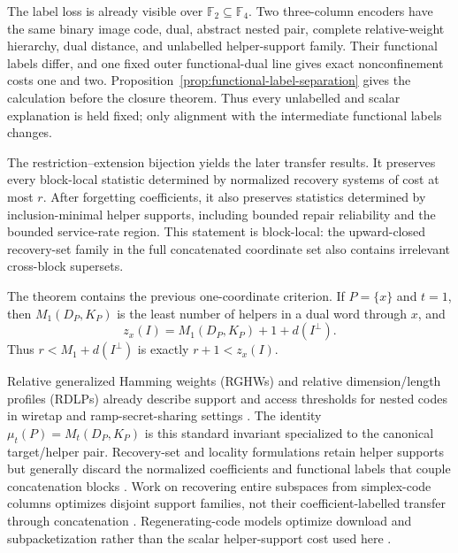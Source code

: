 \documentclass[11pt]{article}
\theoremstyle{definition}
\newcommand{\F}{\mathbb F}
\begin{document}
The label loss is already visible over $\F_2\subseteq\F_4$.  Two
three-column encoders have the same binary image code, dual, abstract nested
pair, complete relative-weight hierarchy, dual distance, and unlabelled
helper-support family.  Their functional labels differ, and one fixed outer
functional-dual line gives exact nonconfinement costs one and two.
Proposition~\ref{prop:functional-label-separation} gives the calculation before
the closure theorem.  Thus every unlabelled and scalar explanation is held
fixed; only alignment with the intermediate functional labels changes.

The restriction--extension bijection yields the later transfer results.  It preserves every
block-local statistic determined by normalized recovery systems of cost at
most $r$.  After forgetting coefficients, it also preserves statistics
determined by inclusion-minimal helper supports, including bounded repair
reliability and the bounded service-rate region.  This statement is
block-local: the upward-closed recovery-set family in the full concatenated
coordinate set also contains irrelevant cross-block supersets.

The theorem contains the previous one-coordinate criterion.  If $P=\{x\}$
and $t=1$, then $M_1(D_P,K_P)$ is the least number of helpers in a dual word
through $x$, and
\[
 z_x(I)=M_1(D_P,K_P)+1+d(I^\perp).
\]
Thus $r<M_1+d(I^\perp)$ is exactly $r+1<z_x(I)$.

Relative generalized Hamming weights (RGHWs) and relative dimension/length
profiles (RDLPs) already describe support and access thresholds for nested
codes in wiretap and ramp-secret-sharing settings
\cite{LuoEtAl2005,KuriharaUyematsuMatsumoto2012,GeilEtAl2014,SanJose2025,
Geil2026}.  The identity $\mu_t(P)=M_t(D_P,K_P)$ is this standard invariant
specialized to the canonical target/helper pair.  Recovery-set and locality
formulations retain helper supports but generally discard the normalized
coefficients and functional labels that couple concatenation blocks
\cite{RawatMazumdarVishwanath2015,GopalanEtAl2012,PamiesEtAl2013,
AbdelGhaffarWeber2017,MarquezCorbellaEtAl2019}.  Work on recovering entire
subspaces from simplex-code columns optimizes disjoint support families, not
their coefficient-labelled transfer through concatenation
\cite{CheeEtAl2024}.  Regenerating-code models
optimize download and subpacketization rather than the scalar helper-support
cost used here \cite{ShahEtAl2010,YeBarg2016,KurzYaakobi2021}.
\end{document}
